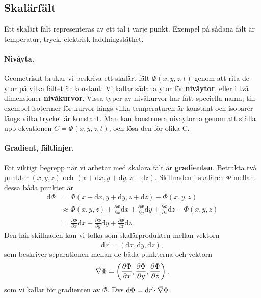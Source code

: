 \documentclass[%
oneside,                 %
final,                   %
10pt]{article}
\begin{document}
\subsection*{Skalärfält}

Ett skalärt fält representeras av ett tal i varje punkt.  Exempel på sådana fält är temperatur, tryck, elektrisk laddningstäthet. 

\paragraph{Nivåyta.}
Geometriskt brukar vi beskriva ett skalärt fält $\Phi(x,y,z,t)$ genom  att rita de ytor på vilka fältet är konstant.  Vi kallar sådana ytor för \textbf{nivåytor}, eller i två dimensioner \textbf{nivåkurvor}.  Vissa typer av nivåkurvor har fått speciella namn, till exempel isotermer för kurvor längs vilka temperaturen är konstant och isobarer längs vilka trycket är konstant.  Man kan konstruera nivåytorna genom att ställa upp  ekvationen $C = \Phi(x,y,z,t)$, och lösa den för olika C.

\paragraph{Gradient, fältlinjer.}
Ett viktigt begrepp när vi arbetar med skalära fält är \textbf{gradienten}. Betrakta två punkter $(x,y,z)$ och $(x+\mbox{d}x,y+\mbox{d}y,z+\mbox{d}z)$. Skillnaden i skalären $\Phi$ mellan dessa båda punkter är
\begin{align}
  \mbox{d}\Phi &= \Phi\left(x+\mbox{d}x, y+\mbox{d}y,z+\mbox{d}z\right) - \Phi\left(x,y,z\right) \nonumber \\ 
& \approx \Phi\left(x,y,z\right) + \frac{\partial \Phi}{\partial x}\mbox{d}x
+ \frac{\partial \Phi}{\partial y}\mbox{d}y + \frac{\partial \Phi}{\partial z}
\mbox{d}z - \Phi\left(x,y,z\right) \nonumber \\ 
& = \frac{\partial \Phi}{\partial x}\mbox{d}x
+ \frac{\partial \Phi}{\partial y}\mbox{d}y + \frac{\partial \Phi}{\partial z}
\mbox{d}z.
\end{align}
Den här skillnaden kan vi tolka som skalärprodukten mellan vektorn 
\begin{equation}
  \mbox{d}\vec{r} = \left(\mbox{d}x,\mbox{d}y,\mbox{d}z\right), 
\end{equation}
som beskriver separationen mellan de båda punkterna och vektorn
\begin{equation}
  \vec{\nabla} \Phi = \left(\frac{\partial \Phi}{\partial x}, 
\frac{\partial \Phi}{\partial y}, \frac{\partial \Phi}{\partial z}\right),
\end{equation}
som vi kallar för gradienten av $\Phi$. Dvs $\mbox{d}\Phi = \mbox{d}\vec{r} \cdot \vec{\nabla} \Phi$.
\end{document}
